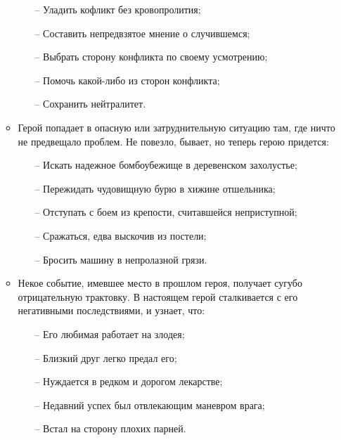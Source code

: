 \begin{enumerate}
\begin{itemize}
        \begin{itemize}
	        \item[--] Уладить кофликт без кровопролития;
	        \item[--] Составить непредвзятое мнение о случившемся;
	        \item[--] Выбрать сторону конфликта по своему усмотрению;
	        \item[--] Помочь какой-либо из сторон конфликта;
	        \item[--] Сохранить нейтралитет.
        \end{itemize}
        \item Герой попадает в опасную или затруднительную ситуацию там, где ничто не предвещало проблем. Не повезло, бывает, но теперь герою придется:
        \begin{itemize}
	        \item[--] Искать надежное бомбоубежище в деревенском захолустье;
	        \item[--] Пережидать чудовищную бурю в хижине отшельника;
	        \item[--] Отступать с боем из крепости, считавшейся неприступной;
	        \item[--] Сражаться, едва выскочив из постели;
	        \item[--] Бросить машину в непролазной грязи.
        \end{itemize}
        \item Некое событие, имевшее место в прошлом героя, получает сугубо отрицательную трактовку. В настоящем герой сталкивается с его негативными последствиями, и узнает, что:
        \begin{itemize}
	        \item[--] Его любимая работает на злодея;
	        \item[--] Близкий друг легко предал его;
	        \item[--] Нуждается в редком и дорогом лекарстве;
	        \item[--] Недавний успех был отвлекающим маневром врага;
	        \item[--] Встал на сторону плохих парней.
        \end{itemize}
    \end{itemize}


\end{enumerate}
